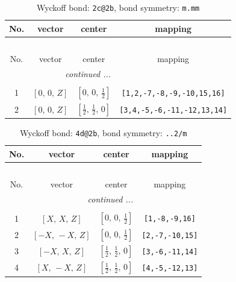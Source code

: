 \documentclass[fleqn,8pt]{jsarticle}
\begin{document}
\begin{longtable}{cccc}
\caption{Wyckoff bond: {\tt 2c@2b}, bond symmetry: {\tt m.mm}}
 \\
 \hline \hline
No. & vector & center & mapping \\ \hline \endfirsthead

\multicolumn{3}{l}{\tablename\ \thetable{}} \\
 \hline \hline
No. & vector & center & mapping \\ \hline \endhead

 \hline \hline
\multicolumn{3}{r}{\footnotesize\it continued ...} \\ \endfoot

 \hline \hline
\multicolumn{3}{r}{} \\ \endlastfoot

1 & $\left[ 0,\, 0,\, Z \right]$ & $\left[ 0,\, 0,\, \frac{1}{2} \right]$ & {\tt [1,2,-7,-8,-9,-10,15,16]} \\ \hline
2 & $\left[ 0,\, 0,\, Z \right]$ & $\left[ \frac{1}{2},\, \frac{1}{2},\, 0 \right]$ & {\tt [3,4,-5,-6,-11,-12,13,14]} \\
\end{longtable}
\renewcommand{\arraystretch}{1.2}
\begin{longtable}{cccc}
\caption{Wyckoff bond: {\tt 4d@2b}, bond symmetry: {\tt ..2/m}}
 \\
 \hline \hline
No. & vector & center & mapping \\ \hline \endfirsthead

\multicolumn{3}{l}{\tablename\ \thetable{}} \\
 \hline \hline
No. & vector & center & mapping \\ \hline \endhead

 \hline \hline
\multicolumn{3}{r}{\footnotesize\it continued ...} \\ \endfoot

 \hline \hline
\multicolumn{3}{r}{} \\ \endlastfoot

1 & $\left[ X,\, X,\, Z \right]$ & $\left[ 0,\, 0,\, \frac{1}{2} \right]$ & {\tt [1,-8,-9,16]} \\ \hline
2 & $\left[ - X,\, - X,\, Z \right]$ & $\left[ 0,\, 0,\, \frac{1}{2} \right]$ & {\tt [2,-7,-10,15]} \\ \hline
3 & $\left[ - X,\, X,\, Z \right]$ & $\left[ \frac{1}{2},\, \frac{1}{2},\, 0 \right]$ & {\tt [3,-6,-11,14]} \\ \hline
4 & $\left[ X,\, - X,\, Z \right]$ & $\left[ \frac{1}{2},\, \frac{1}{2},\, 0 \right]$ & {\tt [4,-5,-12,13]} \\
\end{longtable}
\end{document}
